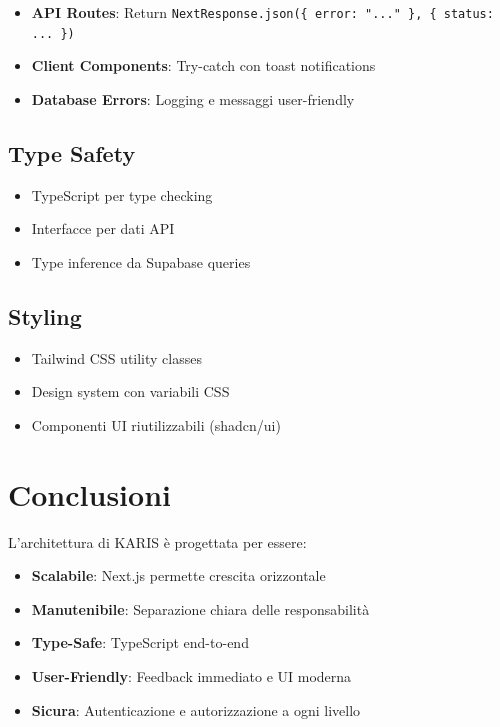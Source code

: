 \documentclass{article}
\begin{document}
\begin{itemize}
\item \textbf{API Routes}: Return \texttt{NextResponse.json(\{ error: "..." \}, \{ status: ... \})}
\item \textbf{Client Components}: Try-catch con toast notifications
\item \textbf{Database Errors}: Logging e messaggi user-friendly
\end{itemize}

\subsection{Type Safety}

\begin{itemize}
\item TypeScript per type checking
\item Interfacce per dati API
\item Type inference da Supabase queries
\end{itemize}

\subsection{Styling}

\begin{itemize}
\item Tailwind CSS utility classes
\item Design system con variabili CSS
\item Componenti UI riutilizzabili (shadcn/ui)
\end{itemize}

\section{Conclusioni}

L'architettura di KARIS è progettata per essere:

\begin{itemize}
\item \textbf{Scalabile}: Next.js permette crescita orizzontale
\item \textbf{Manutenibile}: Separazione chiara delle responsabilità
\item \textbf{Type-Safe}: TypeScript end-to-end
\item \textbf{User-Friendly}: Feedback immediato e UI moderna
\item \textbf{Sicura}: Autenticazione e autorizzazione a ogni livello
\end{itemize}
\end{document}
